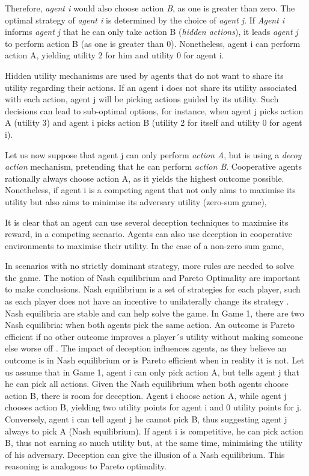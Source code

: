 Therefore, \textit{agent i} would also choose action \textit{B}, as one is greater than zero. The optimal strategy of \textit{agent i} is determined by the choice of \textit{agent j}. If \textit{Agent i} informs \textit{agent j} that he can only take action B (\textit{hidden actions}), it leads \textit{agent j} to perform action B (as one is greater than 0). Nonetheless, agent i can perform action A, yielding utility 2 for him and utility 0 for agent i. 

Hidden utility mechanisms are used by agents that do not want to share its utility regarding their actions. If an agent i does not share its utility associated with each action, agent j will be picking actions guided by its utility. Such decisions can lead to sub-optimal options, for instance, when agent j picks action A (utility 3) and agent i picks action B (utility 2 for itself and utility 0 for agent i). 
 
Let us now suppose that agent j can only perform \textit{action A}, but is using a \textit{decoy action} mechanism, pretending that he can perform \textit{action B}. Cooperative agents rationally always choose action A, as it yields the highest outcome possible. Nonetheless, if agent i is a competing agent that not only aims to maximise its utility but also aims to minimise its adversary utility (zero-sum game), 

It is clear that an agent can use several deception techniques to maximise its reward, in a competing scenario. Agents can also use deception in cooperative environments to maximise their utility. In the case of a non-zero sum game, 

In scenarios with no strictly dominant strategy, more rules are needed to solve the game. The notion of Nash equilibrium and Pareto Optimality are important to make conclusions. Nash equilibrium is a set of strategies for each player, such as each player does not have an incentive to unilaterally change its strategy \cite{rh}. Nash equilibria are stable and can help solve the game. In Game 1, there are two Nash equilibria: when both agents pick the same action. An outcome is Pareto efficient if no other outcome improves a player´s utility without making someone else worse off \cite{rh}. The impact of deception influences agents, as they believe an outcome is in Nash equilibrium or is Pareto efficient when in reality it is not. Let us assume that in Game 1, agent i can only pick action A, but tells agent j that he can pick all actions. Given the Nash equilibrium when both agents choose action B, there is room for deception. Agent i choose action A, while agent j chooses action B, yielding two utility points for agent i and 0 utility points for j.
Conversely, agent i can tell agent j he cannot pick B, thus suggesting agent j always to pick A (Nash equilibrium). If agent i is competitive, he can pick action B, thus not earning so much utility but, at the same time, minimising the utility of his adversary. Deception can give the illusion of a Nash equilibrium. This reasoning is analogous to Pareto optimality. 


